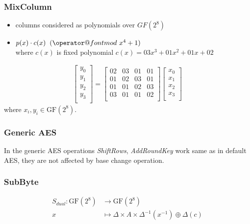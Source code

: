 \documentclass[11pt,oneside,final]{fithesis2}
\makeatletter
\def\imod#1{\allowbreak\mkern10mu({\operator@font mod}\,\,#1)}
\makeatother
\begin{document}
	\subsubsection*{MixColumn}
	    \begin{itemize}
	    \item columns considered as polynomials over $GF(2^8)$
	    \item $p(x) \cdot c(x) \imod{x^4+1}$\\
	    where $c(x)$ is fixed polynomial $c(x) = 03x^3+01x^2 + 01x + 02$
	    \end{itemize}
	    \begin{align}
		\begin{bmatrix}
		    y_0\\
		    y_1\\
		    y_2\\
		    y_3\\
		\end{bmatrix}
		    =	
		\begin{bmatrix}
		    02 & 03 & 01 & 01\\
		    01 & 02 & 03 & 01\\
		    01 & 01 & 02 & 03\\
		    03 & 01 & 01 & 02\\
		\end{bmatrix}
		\begin{bmatrix}
		    x_0\\
		    x_1\\
		    x_2\\
		    x_3\\
		\end{bmatrix}
	    \end{align}
	where $x_i, y_i \in \text{GF}(2^8)$.
	\newpage

	\subsubsection{Generic AES}
	In the generic AES operations \emph{ShiftRows}, \emph{AddRoundKey} work same as in default AES, they are not affected by base change operation.

	\subsubsection*{SubByte}
	\begin{align}
	S_{dual}: \text{GF}(2^8) & \longrightarrow  \text{GF}(2^8)\\
	x               & \longmapsto \Delta \times A \times \Delta^{-1} \left( x^{-1} \right) \oplus \Delta \left(c\right)
	\end{align}
\end{document}
